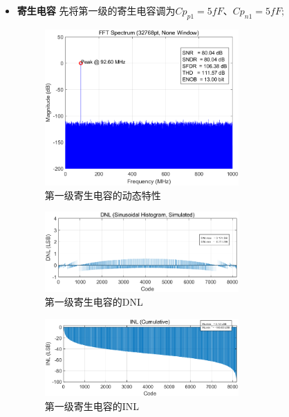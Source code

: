 \documentclass[cs4size,a4paper]{ctexart}
\numberwithin{equation}{section}
\numberwithin{table}{section}
\numberwithin{figure}{section}
\begin{document}
\begin{itemize}
		\item \textbf{寄生电容} 先将第一级的寄生电容调为$Cp_{p1}  = 5fF $、$ Cp_{n1} = 5fF;$ 
		\begin{figure}[H]
			\centering
			\includegraphics[width=0.7\textwidth]{pic/Co/DFT1.png}
			\caption{第一级寄生电容的动态特性} 
		\end{figure}

		\begin{figure}[H]
			\centering
			\includegraphics[width=0.7\textwidth]{pic/Co/DNL1.png}
			\caption{第一级寄生电容的DNL} 
		\end{figure}

		\begin{figure}[H]
			\centering
			\includegraphics[width=0.7\textwidth]{pic/Co/INL1.png}
			\caption{第一级寄生电容的INL} 
		\end{figure}


\end{itemize}
\end{document}
